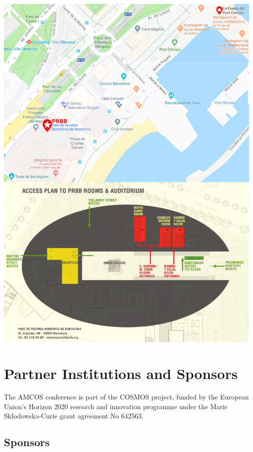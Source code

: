 \documentclass[
openany, %
parskip=full, %
12pt, %
a4paper, %
]{conferencebooklet} %
\begin{document}
	\includegraphics[width=\linewidth]{images/amcos_map}
	
	
	\chapter{Partner Institutions and Sponsors}
	
	The AMCOS conference is part of the COSMOS project, funded by the European Union’s Horizon 2020 research and innovation programme under the Marie Sk\l{}odowska-Curie grant agreement No 642563.
	
	\section{Sponsors}
	
\end{document}
